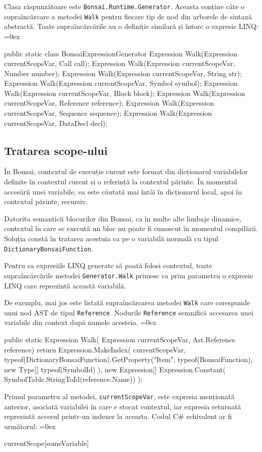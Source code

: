 \documentclass[12pt,a4paper]{memoir}
\renewcommand{\c}{\texttt}
\newenvironment{code}
{
\definecolor{shadecolor}{gray}{0.91}
\topsep=0ex
\relax
\shaded
\verbatim
}
{
\endverbatim
\endshaded
}
\begin{document}
Clasa răspunzătoare este \c{Bonsai.Runtime.Generator}. Aceasta conține câte o supraîncărcare a metodei \c{Walk} pentru fiecare tip de nod din arborele de sintaxă abstractă. Toate supraîncărcările au o definiție similară și întorc o expresie LINQ:
\begin{code}
public static class BonsaiExpressionGenerator {
  Expression Walk(Expression currentScopeVar, Call call);       
  Expression Walk(Expression currentScopeVar, Number number);
  Expression Walk(Expression currentScopeVar, String str);
  Expression Walk(Expression currentScopeVar, Symbol symbol);
  Expression Walk(Expression currentScopeVar, Block block);
  Expression Walk(Expression currentScopeVar, Reference reference);
  Expression Walk(Expression currentScopeVar, Sequence sequence);
  Expression Walk(Expression currentScopeVar, DataDecl decl);
}
\end{code}

\subsection{Tratarea scope-ului}\label{sec:ScopeManagement}

În Bonsai, contextul de execuție curent este format din dicționarul variabilelor definite în contextul curent și o referință la contextul părinte. În momentul accesării unei variabile, ea este căutată mai întâi în dicționarul local, apoi în contextul părinte, recursiv.

Datorita semanticii blocurilor din Bonsai, ca în multe alte limbaje dinamice, contextul în care se execută un bloc nu poate fi cunoscut în momentul compilării. Soluția constă în tratarea acestuia ca pe o variabilă normală cu tipul \c{DictionaryBonsaiFunction}. 

Pentru ca expresiile LINQ generate să poată folosi contextul, toate supraîncărcările metodei \c{Generator.Walk} primesc ca prim parametru o expresie LINQ care reprezintă această variabilă.

De exemplu, mai jos este listată supraîncărcarea metodei \c{Walk} care corespunde unui nod AST de tipul \c{Reference}. Nodurile \c{Reference} semnifică accesarea unei variabile din context după numele acesteia. 
\begin{code}
public static Expression Walk(
    Expression currentScopeVar,
    Ast.Reference reference)
{
    return Expression.MakeIndex(
        currentScopeVar,
        typeof(DictionaryBonsaiFunction).GetProperty("Item", 
            typeof(BonsaiFunction), new Type[] { typeof(SymbolId) }), 
        new Expression[] { Expression.Constant(
            SymbolTable.StringToId(reference.Name)) });
}
\end{code}
Primul parametru al metodei, \c{currentScopeVar}, este expresia menționată anterior, asociată variabilei în care e stocat contextul, iar expresia returnată reprezintă accesul printr-un indexer la aceasta. Codul C\# echivalent ar fi următorul:
\begin{code}
currentScope[someVariable]
\end{code}
\end{document}
